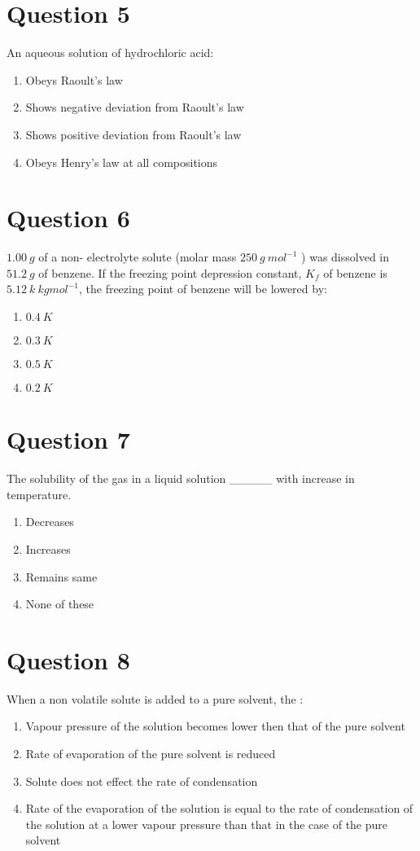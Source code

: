 \documentclass{article}
\begin{document}
\section*{Question 5}
An aqueous solution of hydrochloric acid:
\begin{enumerate}[label=(\alph*)]
\item Obeys Raoult's law
\item Shows negative deviation from Raoult's law
\item Shows positive deviation from Raoult's law
\item Obeys Henry's law at all compositions
\end{enumerate}
\newpage
\section*{Question 6}
\(1.00 {~g}\) of a non- electrolyte solute (molar mass \(250 {~g} {~mol}^{-1}\) ) was dissolved in \(51.2 {~g}\) of benzene. If the freezing point depression constant, \({K}_{{f}}\) of benzene is \(5.12 {~k} {~kg} {mol}^{-1}\), the freezing point of benzene will be lowered by:
\begin{enumerate}[label=(\alph*)]
\item \(0.4 {~K}\)
\item \(0.3 {~K}\)
\item \(0.5 {~K}\)
\item \(0.2 {~K}\)
\end{enumerate}
\newpage
\section*{Question 7}
The solubility of the gas in a liquid solution _____ with increase in temperature.
\begin{enumerate}[label=(\alph*)]
\item Decreases
\item Increases
\item Remains same
\item None of these
\end{enumerate}
\newpage
\section*{Question 8}
When a non volatile solute is added to a pure solvent, the :
\begin{enumerate}[label=(\alph*)]
\item Vapour pressure of the solution becomes lower then that of the pure solvent
\item Rate of evaporation of the pure solvent is reduced
\item Solute does not effect the rate of condensation
\item Rate of the evaporation of the solution is equal to the rate of condensation of the solution at a lower vapour pressure than that in the case of the pure solvent
\end{enumerate}
\newpage
\end{document}
